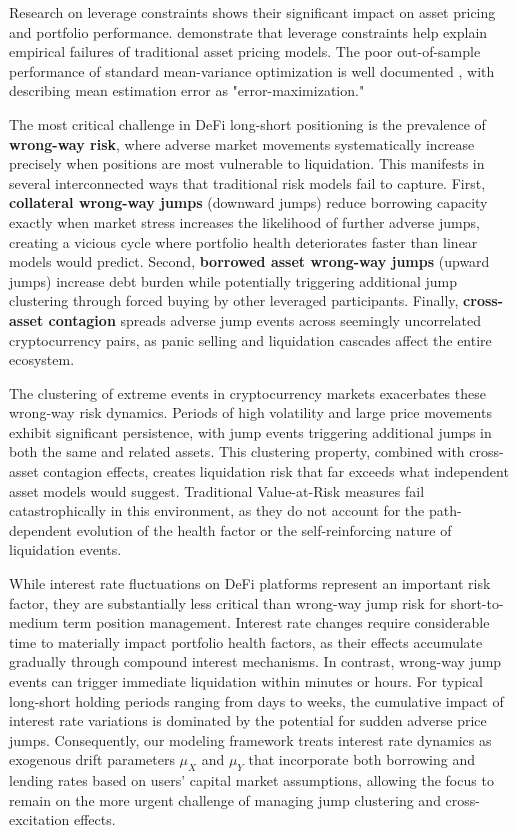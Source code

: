 \documentclass{article}
\theoremstyle{definition}
\begin{document}
Research on leverage constraints shows their significant impact on asset pricing and portfolio performance. \citet{FrazziniPedersen2014} demonstrate that leverage constraints help explain empirical failures of traditional asset pricing models. The poor out-of-sample performance of standard mean-variance optimization is well documented \citep{FrostSavarino1986, BestGrauer1991, ChopraZiemba1993}, with \citet{Michaud1989} describing mean estimation error as "error-maximization."

The most critical challenge in DeFi long-short positioning is the prevalence of \textbf{wrong-way risk}, where adverse market movements systematically increase precisely when positions are most vulnerable to liquidation. This manifests in several interconnected ways that traditional risk models fail to capture. First, \textbf{collateral wrong-way jumps} (downward jumps) reduce borrowing capacity exactly when market stress increases the likelihood of further adverse jumps, creating a vicious cycle where portfolio health deteriorates faster than linear models would predict. Second, \textbf{borrowed asset wrong-way jumps} (upward jumps) increase debt burden while potentially triggering additional jump clustering through forced buying by other leveraged participants. Finally, \textbf{cross-asset contagion} spreads adverse jump events across seemingly uncorrelated cryptocurrency pairs, as panic selling and liquidation cascades affect the entire ecosystem.

The clustering of extreme events in cryptocurrency markets exacerbates these wrong-way risk dynamics. Periods of high volatility and large price movements exhibit significant persistence, with jump events triggering additional jumps in both the same and related assets. This clustering property, combined with cross-asset contagion effects, creates liquidation risk that far exceeds what independent asset models would suggest. Traditional Value-at-Risk measures fail catastrophically in this environment, as they do not account for the path-dependent evolution of the health factor or the self-reinforcing nature of liquidation events.

While interest rate fluctuations on DeFi platforms represent an important risk factor, they are substantially less critical than wrong-way jump risk for short-to-medium term position management. Interest rate changes require considerable time to materially impact portfolio health factors, as their effects accumulate gradually through compound interest mechanisms. In contrast, wrong-way jump events can trigger immediate liquidation within minutes or hours. For typical long-short holding periods ranging from days to weeks, the cumulative impact of interest rate variations is dominated by the potential for sudden adverse price jumps. Consequently, our modeling framework treats interest rate dynamics as exogenous drift parameters $\mu_X$ and $\mu_Y$ that incorporate both borrowing and lending rates based on users' capital market assumptions, allowing the focus to remain on the more urgent challenge of managing jump clustering and cross-excitation effects.
\end{document}
